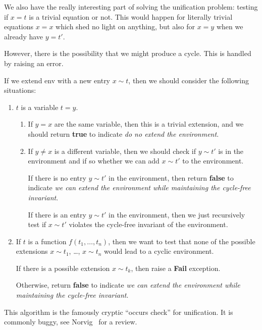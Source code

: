 \begin{node}
We also have the really interesting part of solving the unification
problem: testing if $x=t$ is a trivial equation or not. This would
happen for literally trivial equations $x=x$ which shed no light on anything,
but also for $x=y$ when we already have $y=t'$.

However, there is the possibility that we might produce a cycle. This
is handled by raising an error.

If we extend {\Tt{}env\nwendquote} with a new entry $x\sim t$, then we should
consider the following situations:
\begin{enumerate}
\item $t$ is a variable $t=y$.
  \begin{enumerate}
  \item If $y=x$ are the same variable, then this is a trivial
    extension, and we should return \textbf{true} to indicate \emph{do
    no extend the environment}.
  \item If $y\neq x$ is a different variable, then we should check if
    $y\sim t'$ is in the environment and if so whether we can add
    $x\sim t'$ to the environment.

    If there is no entry $y\sim t'$ in the environment, then return
    \textbf{false} to indicate \emph{we can extend the environment
    while maintaining the cycle-free invariant}.

    If there is an entry $y\sim t'$ in the environment, then we just
    recursively test if $x\sim t'$ violates the cycle-free invariant
    of the environment.
  \end{enumerate}
\item If $t$ is a function $f(t_{1},\dots,t_{n})$, then we want to test 
  that none of the possible extensions $x\sim t_{1}$, \dots, $x\sim t_{n}$
  would lead to a cyclic environment.

  If there is a possible extension $x\sim t_{k}$, then raise a
  \textbf{Fail} exception.

  Otherwise, return \textbf{false} to indicate \emph{we can extend the
  environment while maintaining the cycle-free invariant}.
\end{enumerate}
This algorithm is the famously cryptic ``occurs check'' for
unification. It is commonly buggy, see Norvig~\cite{norvig1991correcting}
for a review.
\end{node}

